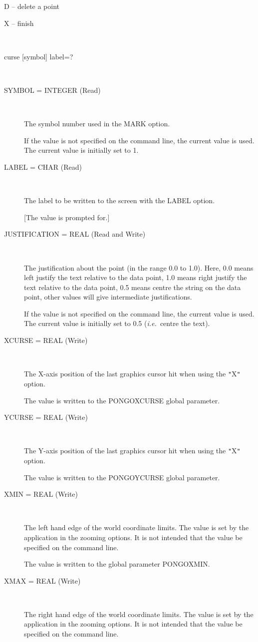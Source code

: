 \documentclass[twoside,11pt]{article}
\renewcommand{\_}{\texttt{\symbol{95}}}
\newcommand{\ie}{{\em i.e.\ }}
\newcommand{\sstusage}[1]{\item[Usage:] \mbox{}
\\[1.3ex]{\raggedright \ssttt #1}}
\newcommand{\sstparameters}[1]{
   \item[Parameters:] \mbox{} \\
   \vspace{-3.5ex}
   \begin{description}
      #1
   \end{description}
}
\newcommand{\sstsubsection}[1]{ \item[{#1}] \mbox{} \\}
\newcommand{\sstitem}{\item}
\newcommand{\sstusage}[1]{\item[Usage:]
      \begin{description}
         {\ssttt #1}
      \end{description}
      \\
   }
\newcommand{\sstparameters}[1]{
      \item[Parameters:] \\
      \begin{description}
         #1
      \end{description}
      \\
   }
\newcommand{\sstsubsection}[1]{\item[{#1}]}
\newcommand{\sstitem}{\item}
\begin{document}
{{{{            \sstitem
                  D -- delete a point

            \sstitem
                  X -- finish
         }
      }
   }
   \sstusage {
      curse [symbol] label=?
   }
   \sstparameters{
      \sstsubsection{
         SYMBOL = \_INTEGER (Read)
      }{
         The symbol number used in the MARK option.

         If the value is not specified on the command line, the current
         value is used. The current value is initially set to 1.
      }
      \sstsubsection{
         LABEL = \_CHAR (Read)
      }{
         The label to be written to the screen with the LABEL option.

         [The value is prompted for.]
      }
      \sstsubsection{
         JUSTIFICATION = \_REAL (Read and Write)
      }{
         The justification about the point (in the range 0.0 to 1.0).
         Here, 0.0 means left justify the text relative to the data
         point, 1.0 means right justify the text relative to the data
         point, 0.5 means centre the string on the data point, other
         values will give intermediate justifications.

         If the value is not specified on the command line, the current
         value is used. The current value is initially set to 0.5
         (\ie centre the text).
      }
      \sstsubsection{
         XCURSE = \_REAL (Write)
      }{
         The X-axis position of the last graphics cursor hit when using
         the {\tt "}X{\tt "} option.

         The value is written to the PONGO\_XCURSE global parameter.
      }
      \sstsubsection{
         YCURSE = \_REAL (Write)
      }{
         The Y-axis position of the last graphics cursor hit when using
         the {\tt "}X{\tt "} option.

         The value is written to the PONGO\_YCURSE global parameter.
      }
      \sstsubsection{
         XMIN = \_REAL (Write)
      }{
         The left hand edge of the world coordinate limits. The value
         is set by the application in the zooming options. It is not
         intended that the value be specified on the command line.

         The value is written to the global parameter PONGO\_XMIN.
      }
      \sstsubsection{
         XMAX = \_REAL (Write)
      }{
         The right hand edge of the world coordinate limits. The value
         is set by the application in the zooming options. It is not
         intended that the value be specified on the command line.

}}}
\end{document}
